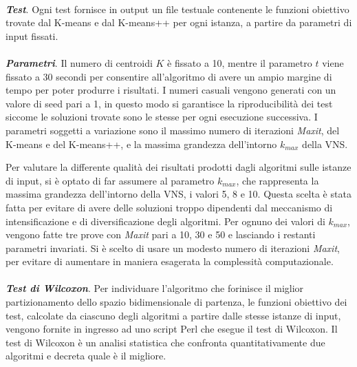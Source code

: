 \documentclass[12pt,a4paper,oneside,hidelinks]{report}
\begin{document}
\paragraph*{}
\textbf{\textit{Test}}. Ogni test fornisce in output un file testuale contenente le funzioni obiettivo trovate dal K-means e dal K-means++ per ogni istanza, a partire da parametri di input fissati.

\paragraph*{}
\textbf{\textit{Parametri}}. Il numero di centroidi $K$ è fissato a 10, mentre il parametro $t$ viene fissato a 30 secondi per consentire all'algoritmo di avere un ampio margine di tempo per poter produrre i risultati. I numeri casuali vengono generati con un valore di seed pari a 1, in questo modo si garantisce la riproducibilità dei test siccome le soluzioni trovate sono le stesse per ogni esecuzione successiva.
I parametri soggetti a variazione sono il massimo numero di iterazioni \textit{Maxit}, del K-means e del K-means++, e la massima grandezza dell'intorno $k_{max}$ della VNS.

Per valutare la differente qualità dei risultati prodotti dagli algoritmi sulle istanze di input, si è optato di far assumere al parametro $k_{max}$, che rappresenta la massima grandezza dell'intorno della VNS, i valori 5, 8 e 10. Questa scelta è stata fatta per evitare di avere delle soluzioni troppo dipendenti dal meccanismo di intensificazione e di diversificazione degli algoritmi.
Per ognuno dei valori di $k_{max}$, vengono fatte tre prove con \textit{Maxit} pari a 10, 30 e 50 e lasciando i restanti parametri invariati. Si è scelto di usare un modesto numero di iterazioni \textit{Maxit}, per evitare di aumentare in maniera esagerata la complessità computazionale. 

\paragraph*{}
\textbf{\textit{Test di Wilcoxon}}. Per individuare l'algoritmo che forinisce il miglior partizionamento dello spazio bidimensionale di partenza, le funzioni obiettivo dei test, calcolate da ciascuno degli algoritmi a partire dalle stesse istanze di input, vengono fornite in ingresso ad uno script Perl che esegue il test di Wilcoxon. Il test di Wilcoxon è un analisi statistica che confronta quantitativamente due algoritmi e decreta quale è il migliore.
\end{document}
